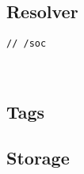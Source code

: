 \subsection{Resolver}\label{spec:format:bzz-api}


\begin{definition}[Resolver]\label{def:resolver}
\begin{lstlisting}[language=buzz1]
// /soc

             
\end{lstlisting}
\end{definition}


\subsection{Tags}\label{spec:format:tags}
\subsection{Storage}\label{spec:format:bzz-api}
